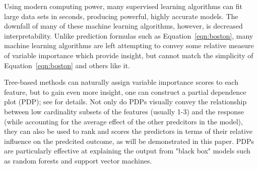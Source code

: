 \documentclass[12pt]{article}
\begin{document}


Using modern computing power, many supervised learning algorithms can fit large data sets in seconds, producing powerful, highly accurate models. The downfall of many of these machine learning algorithms, however, is decreased interpretability. Unlike prediction formulas such as Equation~\eqref{eqn:boston}, many machine learning algorithms are left attempting to convey some relative measure of variable importance which provide insight, but cannot match the simplicity of Equation~\eqref{eqn:boston} and others like it.

Tree-based methods can naturally assign variable importance scores to each feature, but to gain even more insight, one can construct a partial dependence plot (PDP); see \citet{friedman-2001-greedy} for details. Not only do PDPs visually convey the relationship between  low cardinality subsets of the features (usually 1-3) and the response (while accounting for the average effect of the other predcitors in the model), they can also be used to rank and scores the predictors in terms of their relative influence on the predcited outcome, as will be demonstrated in this paper. PDPs are particularly effective at explaining the output from "black box" models such as random forests and support vector machines.
\end{document}
